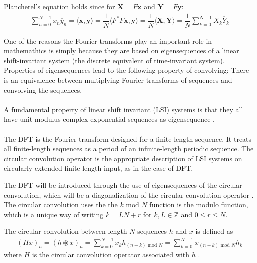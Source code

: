Plancherel's equation holds since for $\textbf{X} = F\textbf{x}$ and $\textbf{Y} = F\textbf{y}$:
\begin{align*}
\sum_{n=0}^{N-1} x_n \overline{y}_n = \langle \textbf{x},\textbf{y} \rangle = \dfrac{1}{N} \langle F^*F\textbf{x},\textbf{y} \rangle = \dfrac{1}{N} \langle \textbf{X},\textbf{Y} \rangle = \dfrac{1}{N} \sum_{k=0}^{N-1} X_k \overline{Y}_k
\end{align*}

One of the reasons the Fourier transforms play an important role in mathemathics is simply because they are based on eigensequences of a linear shift-invariant system (the discrete equivalent of time-invariant system).
Properties of eigensequences lead to the following property of convolving:
There is an equivalence between multiplying Fourier transforms of sequences and convolving the sequences.
\\\\
 A fundamental property of linear shift invariant (LSI) systems is that they all have unit-modulus complex exponential sequences as eigensequence \cite{FSP}.
\\\\
The DFT is the Fourier transform designed for a finite length sequence.
It treats all finite-length sequences as a period of an infinite-length periodic sequence.
The circular convolution operator is the appropriate description of LSI systems on circularly extended finite-length input, as in the case of DFT. 

The DFT will be introduced through the use of eigensequences of the circular convolution, which will be a diagonalization of the circular convolution operator \cite{FSP}. The circular convolution uses the the $k \text{ mod } N$ function is the modulo function, which is a unique way of writing $k = LN + r$ for $k,L \in \mathbb{Z}$ and $0\leq r \leq N$.

\begin{definition}
 	The circular convolution between length-$N$ sequences $h$ and $x$ is defined as
\begin{align*}
	(Hx)_n = (h \circledast x)_n = \sum_{k = 0}^{N-1} x_k h_{(n-k) \text{ mod } N} =\sum_{k = 0}^{N-1} x_{(n-k) \text{ mod } N} h_k
\end{align*}
where $H$ is the circular convolution operator associated with $h$ .
\end{definition}

